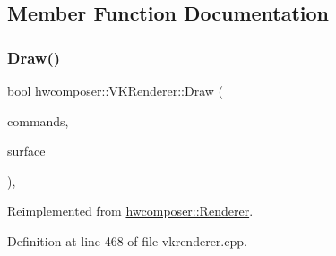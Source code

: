 \subsection{Member Function Documentation}
\mbox{\label{classhwcomposer_1_1VKRenderer_a05f1c449173cc2b4f479bf5be404ebb3}} 
\subsubsection{\texorpdfstring{Draw()}{Draw()}}
{\footnotesize\ttfamily bool hwcomposer\+::\+V\+K\+Renderer\+::\+Draw (\begin{DoxyParamCaption}\item[{const std\+::vector$<$ \mbox{\hyperlink{structhwcomposer_1_1RenderState}{Render\+State}} $>$ \&}]{commands,  }\item[{\mbox{\hyperlink{classhwcomposer_1_1NativeSurface}{Native\+Surface}} $\ast$}]{surface }\end{DoxyParamCaption})\hspace{0.3cm}{\ttfamily [override]}, {\ttfamily [virtual]}}



Reimplemented from \mbox{\hyperlink{classhwcomposer_1_1Renderer_ab147e6d44d429c0ada5a3212ef7100f1}{hwcomposer\+::\+Renderer}}.



Definition at line 468 of file vkrenderer.\+cpp.


